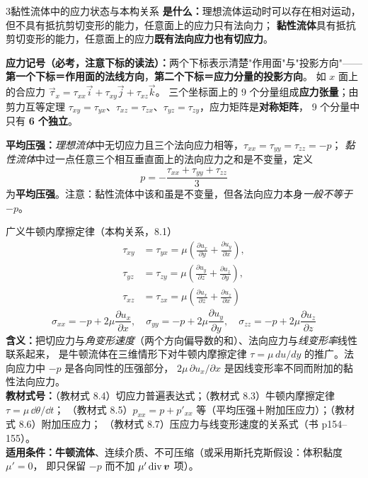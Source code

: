 \begin{kaodian}{3}{黏性流体中的应力状态与本构关系}
\textbf{是什么：}理想流体运动时可以存在相对运动，但不具有抵抗剪切变形的能力，任意面上的应力只有法向力；
\textbf{黏性流体}具有抵抗剪切变形的能力，任意面上的应力\textbf{既有法向应力也有切应力}。

\textbf{应力记号（必考，注意下标的读法）：}两个下标表示清楚"作用面"与"投影方向"——
\textbf{第一个下标＝作用面的法线方向}，\textbf{第二个下标＝应力分量的投影方向}。
如 $x$ 面上的合应力 $\vec{\tau}_x=\tau_{xx}\vec{i}+\tau_{xy}\vec{j}+\tau_{xz}\vec{k}$。
三个坐标面上的 9 个分量组成\textbf{应力张量}；由剪力互等定理
$\tau_{xy}=\tau_{yx}$、$\tau_{xz}=\tau_{zx}$、$\tau_{yz}=\tau_{zy}$，应力矩阵是\textbf{对称矩阵}，
9 个分量中只有 \textbf{6 个独立}。

\textbf{平均压强：}\emph{理想流体}中无切应力且三个法向应力相等，$\tau_{xx}=\tau_{yy}=\tau_{zz}=-p$；
\emph{黏性流体}中过一点任意三个相互垂直面上的法向应力之和是不变量，定义
\[ p=-\frac{\tau_{xx}+\tau_{yy}+\tau_{zz}}{3} \]
为\textbf{平均压强}。注意：黏性流体中该和虽是不变量，但各法向应力本身\emph{一般不等于} $-p$。

\begin{gongshi}{广义牛顿内摩擦定律（本构关系，8.1）}
\[ \begin{aligned}
   \tau_{xy}&=\tau_{yx}=\mu\left(\frac{\partial u_x}{\partial y}+\frac{\partial u_y}{\partial x}\right),\\
   \tau_{yz}&=\tau_{zy}=\mu\left(\frac{\partial u_y}{\partial z}+\frac{\partial u_z}{\partial y}\right),\\
   \tau_{xz}&=\tau_{zx}=\mu\left(\frac{\partial u_x}{\partial z}+\frac{\partial u_z}{\partial x}\right)
   \end{aligned} \]
\[ \sigma_{xx}=-p+2\mu\frac{\partial u_x}{\partial x},\quad
   \sigma_{yy}=-p+2\mu\frac{\partial u_y}{\partial y},\quad
   \sigma_{zz}=-p+2\mu\frac{\partial u_z}{\partial z} \]
\textbf{含义：}把切应力与\emph{角变形速度}（两个方向偏导数的和）、法向应力与\emph{线变形率}线性联系起来，
是牛顿流体在三维情形下对牛顿内摩擦定律 $\tau=\mu\,du/dy$ 的推广。法向应力中 $-p$ 是各向同性的压强部分，
$2\mu\,\partial u_x/\partial x$ 是因线变形率不同而附加的黏性法向应力。\\
\textbf{教材式号：}（教材式 8.4）切应力普遍表达式；（教材式 8.3）牛顿内摩擦定律 $\tau=\mu\,\dd\theta/\dd t$；
（教材式 8.5）$p_{xx}=p+p'_{xx}$ 等（平均压强＋附加压应力）；（教材式 8.6）附加压应力；
（教材式 8.7）压应力与线变形速度的关系式（书 p154--155）。\\
\textbf{适用条件：}\textbf{牛顿流体}、连续介质、不可压缩（或采用斯托克斯假设：体积黏度 $\mu'=0$，
即只保留 $-p$ 而不加 $\mu'\,\mathrm{div}\,\bm{v}$ 项）。
\end{gongshi}


\end{kaodian}

